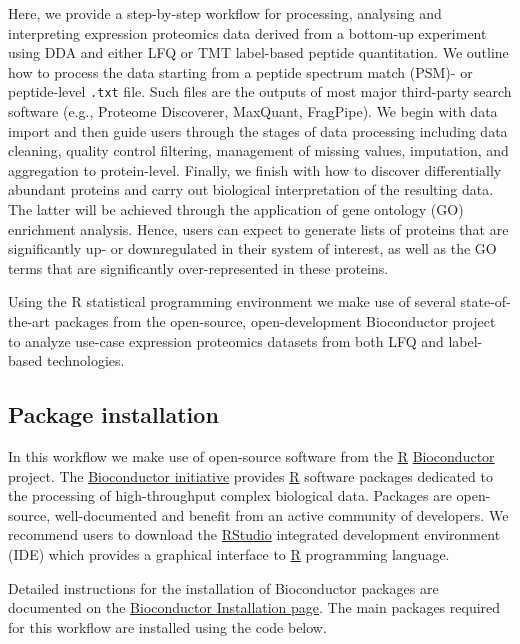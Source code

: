 \documentclass[9pt,a4paper,]{extarticle}
\begin{document}
Here, we provide a step-by-step workflow for processing, analysing and
interpreting expression proteomics data derived from a bottom-up experiment
using DDA and either LFQ or TMT label-based peptide quantitation. We outline how
to process the data starting from a peptide spectrum match (PSM)- or peptide-level
\texttt{.txt} file. Such files are the outputs of most major third-party search
software (e.g., Proteome Discoverer, MaxQuant, FragPipe). We begin with data
import and then guide users through the stages of data processing including data
cleaning, quality control filtering, management of missing values, imputation,
and aggregation to protein-level. Finally, we finish with how to discover
differentially abundant proteins and carry out biological interpretation of the
resulting data. The latter will be achieved through the application of gene
ontology (GO) enrichment analysis. Hence, users can expect to generate lists of
proteins that are significantly up- or downregulated in their system of interest,
as well as the GO terms that are significantly over-represented in these proteins.

Using the R statistical programming environment \citep{Rstat} we make use of several
state-of-the-art packages from the open-source, open-development Bioconductor
project \citep{Huber2015} to analyze use-case expression proteomics datasets
\citep{HutchingsData} from both LFQ and label-based technologies.

\subsection{Package installation}\label{package-installation}

In this workflow we make use of open-source software from the
\href{https://www.r-project.org}{R} \href{https://bioconductor.org}{Bioconductor}
\citep{Huber2015} project. The \href{https://bioconductor.org}{Bioconductor initiative}
provides \href{https://www.r-project.org}{R} software packages dedicated
to the processing of high-throughput complex biological data. Packages are
open-source, well-documented and benefit from an active community of developers.
We recommend users to download the
\href{https://posit.co/download/rstudio-desktop/}{RStudio} integrated development
environment (IDE) which provides a graphical interface to
\href{https://www.r-project.org}{R} programming language.

Detailed instructions for the installation of Bioconductor packages are
documented on the \href{http://bioconductor.org/install/}{Bioconductor Installation page}.
The main packages required for this workflow are installed using the code below.
\end{document}
